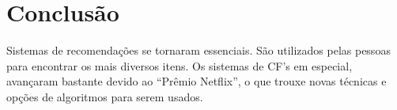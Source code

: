 \section{Conclusão}

\par
Sistemas de recomendações se tornaram essenciais. São utilizados pelas pessoas para encontrar os mais diversos itens. Os sistemas de CF's em especial, avançaram bastante devido ao ``Prêmio Netflix'', o que trouxe novas técnicas e opções de algoritmos para serem usados.
